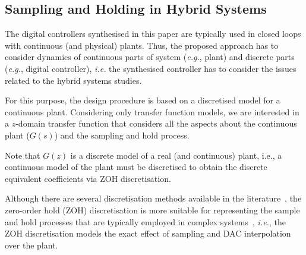 \documentclass{sig-alternate-05-2015}
\newcommand{\red}[1]{{\color{red}#1}}
\begin{document}

\subsection{Sampling and Holding in Hybrid Systems}
\label{ssec:SandH}

The digital controllers synthesised in this paper are typically used in
closed loops with continuous (and physical) plants.  Thus, the proposed
approach has to consider dynamics of continuous parts of system ({\it e.g.},
plant) and discrete parts ({\it e.g.}, digital controller), {\it i.e.} the
synthesised controller has to consider the issues related to the hybrid
systems studies.

For this purpose, the design procedure is based on a discretised model for a
continuous plant.  Considering only transfer function models, we are
interested in a $z$-domain transfer function that considers all the aspects
about the continuous plant ($G(s)$) and the sampling and hold process.

Note that $G(z)$ is a discrete model of a real (and continuous) plant, i.e.,
a continuous model of the plant must be discretised to obtain the discrete
equivalent coefficients via ZOH discretisation.


Although there are several discretisation methods available in the
literature~\cite{Franklin15}, the zero-order hold (ZOH) discretisation is
more suitable for representing the sample and hold processes that are
typically employed in complex systems~\cite{istepanian2012digital}, {\it
i.e.}, the ZOH discretisation models the exact effect of sampling and DAC
interpolation over the plant.
\end{document}
